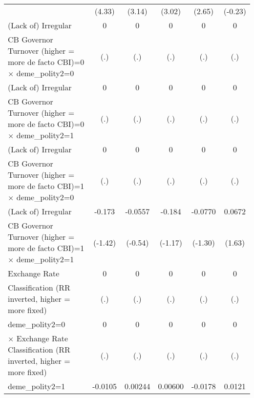 {\begin{tabular}{l*{5}{c}}
                    &      (4.33)         &      (3.14)         &      (3.02)         &      (2.65)         &     (-0.23)         \\
[1em]
(Lack of) Irregular &           0         &           0         &           0         &           0         &           0         \\
CB Governor Turnover (higher = more de facto CBI)=0 $\times$ deme\_polity2=0&         (.)         &         (.)         &         (.)         &         (.)         &         (.)         \\
[1em]
(Lack of) Irregular &           0         &           0         &           0         &           0         &           0         \\
CB Governor Turnover (higher = more de facto CBI)=0 $\times$ deme\_polity2=1&         (.)         &         (.)         &         (.)         &         (.)         &         (.)         \\
[1em]
(Lack of) Irregular &           0         &           0         &           0         &           0         &           0         \\
CB Governor Turnover (higher = more de facto CBI)=1 $\times$ deme\_polity2=0&         (.)         &         (.)         &         (.)         &         (.)         &         (.)         \\
[1em]
(Lack of) Irregular &      -0.173         &     -0.0557         &      -0.184         &     -0.0770         &      0.0672         \\
CB Governor Turnover (higher = more de facto CBI)=1 $\times$ deme\_polity2=1&     (-1.42)         &     (-0.54)         &     (-1.17)         &     (-1.30)         &      (1.63)         \\
[1em]
Exchange Rate       &           0         &           0         &           0         &           0         &           0         \\
Classification (RR inverted, higher = more fixed)&         (.)         &         (.)         &         (.)         &         (.)         &         (.)         \\
[1em]
deme\_polity2=0      &           0         &           0         &           0         &           0         &           0         \\
$\times$ Exchange Rate Classification (RR inverted, higher = more fixed)&         (.)         &         (.)         &         (.)         &         (.)         &         (.)         \\
[1em]
deme\_polity2=1      &     -0.0105         &     0.00244         &     0.00600         &     -0.0178         &      0.0121         \\

\end{tabular}}

